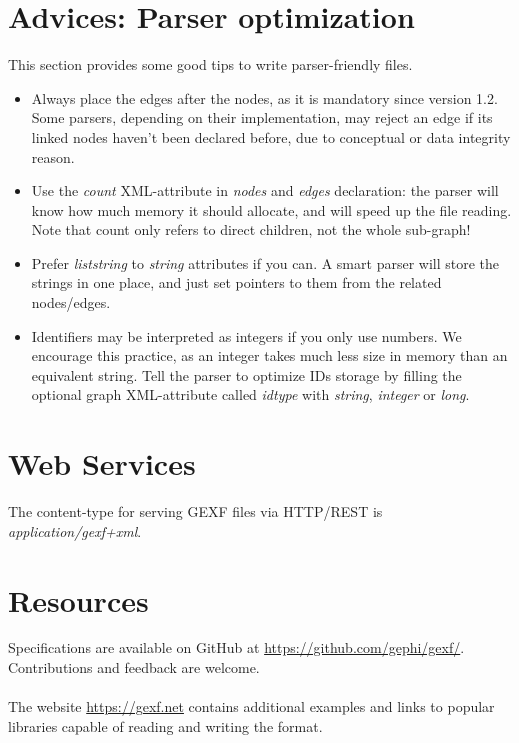 \documentclass[a4paper,10pt]{article}
\begin{document}
\section{Advices: Parser optimization} \label{advices}

This section provides some good tips to write parser-friendly files.
\begin{itemize}
 \item Always place the edges after the nodes, as it is mandatory since version 1.2. Some parsers, depending on their implementation, may reject an edge if its linked nodes haven't been declared before, due to conceptual or data integrity reason.
 \item Use the \textit{count} XML-attribute in \textit{nodes} and \textit{edges} declaration: the parser will know how much memory it should allocate, and will speed up the file reading. Note that count only refers to direct children, not the whole sub-graph!
 \item Prefer \textit{liststring} to \textit{string} attributes if you can. A smart parser will store the strings in one place, and just set pointers to them from the related nodes/edges.
 \item Identifiers may be interpreted as integers if you only use numbers. We encourage this practice, as an integer takes much less size in memory than an equivalent string. Tell the parser to optimize IDs storage by filling the optional graph XML-attribute called \textit{idtype} with \textit{string}, \textit{integer} or \textit{long}.
\end{itemize}

\section{Web Services} \label{ws}

The content-type for serving GEXF files via HTTP/REST is \textit{application/gexf+xml}.

\section{Resources} \label{resources}

Specifications are available on GitHub at \href{https://github.com/gephi/gexf/}{https://github.com/gephi/gexf/}. Contributions and feedback are welcome.

\paragraph{}
The website \href{https://gexf.net}{https://gexf.net} contains additional examples and links to popular libraries capable of reading and writing the format.
\end{document}
